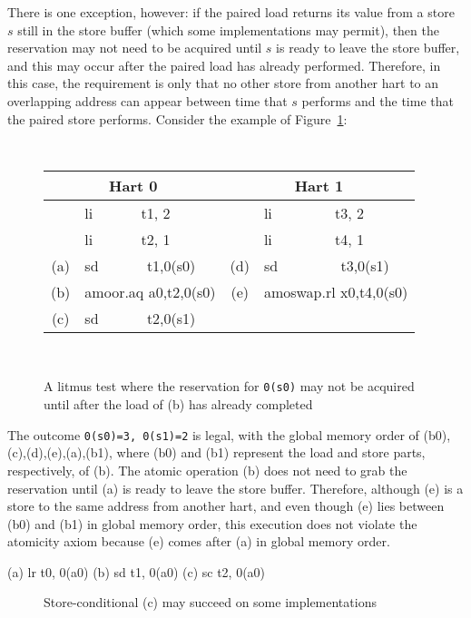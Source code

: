 There is one exception, however: if the paired load returns its value from a store $s$ still in the store buffer (which some implementations may permit), then the reservation may not need to be acquired until $s$ is ready to leave the store buffer, and this may occur after the paired load has already performed.
Therefore, in this case, the requirement is only that no other store from another hart to an overlapping address can appear between time that $s$ performs and the time that the paired store performs.
Consider the example of Figure~\ref{fig:litmus:lateatomic}:

\begin{figure}[h!]
  \centering
  {
    \setlength{\tabcolsep}{2mm}
    \tt\footnotesize
    \begin{tabular}{cl||cl}
    \multicolumn{2}{c}{Hart 0} & \multicolumn{2}{c}{Hart 1} \\
    \hline
          & li~~~~~~ t1, 2       &     & li~~~~~~~~ t3, 2    \\
          & li~~~~~~ t2, 1       &     & li~~~~~~~~ t4, 1    \\
      (a) & sd~~~~~~ t1,0(s0)    & (d) & sd~~~~~~~~ t3,0(s1) \\
      (b) & amoor.aq a0,t2,0(s0) & (e) & amoswap.rl x0,t4,0(s0) \\
      (c) & sd~~~~~~ t2,0(s1)    &     &             \\
    \end{tabular}
  }
  ~~
  \diagram
  \caption{A litmus test where the reservation for {\tt 0(s0)} may not be acquired until after the load of (b) has already completed}
  \label{fig:litmus:lateatomic}
\end{figure}

The outcome {\tt 0(s0)=3, 0(s1)=2} is legal, with the global memory order of (b0),(c),(d),(e),(a),(b1), where (b0) and (b1) represent the load and store parts, respectively, of (b).
The atomic operation (b) does not need to grab the reservation until (a) is ready to leave the store buffer.
Therefore, although (e) is a store to the same address from another hart, and even though (e) lies between (b0) and (b1) in global memory order, this execution does not violate the atomicity axiom because (e) comes after (a) in global memory order.

\begin{verbbox}
(a) lr t0, 0(a0)
(b) sd t1, 0(a0)
(c) sc t2, 0(a0)
\end{verbbox}
\begin{figure}[h!]
  \centering\small
  \theverbbox
  \caption{Store-conditional (c) may succeed on some implementations}
  \label{fig:litmus:lrsdsc}
\end{figure}

